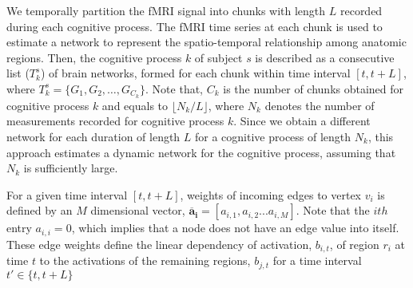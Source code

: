 \documentclass[runningheads]{llncs}
\begin{document}

We temporally partition the fMRI signal into chunks with length $L$ recorded during each cognitive process. The fMRI time series at each chunk is used to estimate a network to represent the spatio-temporal relationship among anatomic regions. Then, the cognitive process $k$ of subject $s$ is described as a consecutive list ($T_{k}^{s}$) of brain networks, formed for each chunk within time interval $[t, t+L]$, where $T_{k}^{s} = \{ G_{1}, G_{2}, \ldots, G_{C_k}\}$. Note that, $C_k$ is the number of chunks obtained for cognitive process $k$ and equals to $\lfloor N_k/L \rfloor$, where $N_k$ denotes the number of measurements recorded for cognitive process $k$. Since we obtain a different network for each duration of length $L$ for a cognitive process of length $N_k$, this approach estimates a dynamic network for the cognitive process, assuming that $N_k$ is sufficiently large. 




For a given time interval $[t, t+L]$, weights of incoming edges to vertex $v_i$ is defined by an $M $ dimensional vector, $\mathbf{\overline{a}_{i}} = [ a_{i,1}, a_{i,2} ... a_{i,M} ]$. Note that the $ith$ entry $a_{i,i} = 0$, which implies that a node does not have an edge value into itself. These edge weights define the linear dependency of activation, $b_{i,t}$, of region $r_i$ at time $t$  to the activations of the remaining regions, $b_{j,t}$ for a time interval $t' \in \{t,t+L\}$
\end{document}
